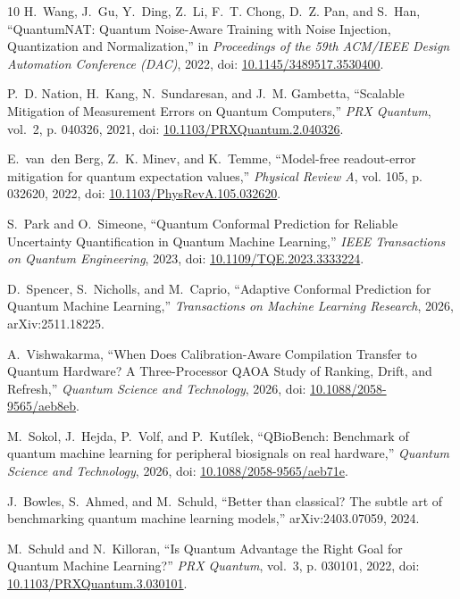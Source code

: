 \documentclass[10pt,conference]{IEEEtran}
\begin{document}
\begin{thebibliography}{10}
H.~Wang, J.~Gu, Y.~Ding, Z.~Li, F.~T. Chong, D.~Z. Pan, and S.~Han,
  ``{QuantumNAT: Quantum Noise-Aware Training with Noise Injection,
  Quantization and Normalization},'' in \emph{Proceedings of the 59th ACM/IEEE
  Design Automation Conference (DAC)}, 2022, doi:
  \href{https://doi.org/10.1145/3489517.3530400}{10.1145/3489517.3530400}.

P.~D. Nation, H.~Kang, N.~Sundaresan, and J.~M. Gambetta, ``{Scalable
  Mitigation of Measurement Errors on Quantum Computers},'' \emph{PRX Quantum},
  vol.~2, p. 040326, 2021, doi:
  \href{https://doi.org/10.1103/PRXQuantum.2.040326}{10.1103/PRXQuantum.2.040326}.

E.~van~den Berg, Z.~K. Minev, and K.~Temme, ``{Model-free readout-error
  mitigation for quantum expectation values},'' \emph{Physical Review A}, vol.
  105, p. 032620, 2022, doi:
  \href{https://doi.org/10.1103/PhysRevA.105.032620}{10.1103/PhysRevA.105.032620}.

S.~Park and O.~Simeone, ``{Quantum Conformal Prediction for Reliable
  Uncertainty Quantification in Quantum Machine Learning},'' \emph{IEEE
  Transactions on Quantum Engineering}, 2023, doi:
  \href{https://doi.org/10.1109/TQE.2023.3333224}{10.1109/TQE.2023.3333224}.

D.~Spencer, S.~Nicholls, and M.~Caprio, ``{Adaptive Conformal Prediction for
  Quantum Machine Learning},'' \emph{Transactions on Machine Learning
  Research}, 2026, arXiv:2511.18225.

A.~Vishwakarma, ``{When Does Calibration-Aware Compilation Transfer to Quantum
  Hardware? A Three-Processor QAOA Study of Ranking, Drift, and Refresh},''
  \emph{Quantum Science and Technology}, 2026, doi:
  \href{https://doi.org/10.1088/2058-9565/aeb8eb}{10.1088/2058-9565/aeb8eb}.

M.~Sokol, J.~Hejda, P.~Volf, and P.~Kut{\'i}lek, ``{QBioBench: Benchmark of
  quantum machine learning for peripheral biosignals on real hardware},''
  \emph{Quantum Science and Technology}, 2026, doi:
  \href{https://doi.org/10.1088/2058-9565/aeb71e}{10.1088/2058-9565/aeb71e}.

J.~Bowles, S.~Ahmed, and M.~Schuld, ``{Better than classical? The subtle art of
  benchmarking quantum machine learning models},'' arXiv:2403.07059, 2024.

M.~Schuld and N.~Killoran, ``{Is Quantum Advantage the Right Goal for Quantum
  Machine Learning?}'' \emph{PRX Quantum}, vol.~3, p. 030101, 2022, doi:
  \href{https://doi.org/10.1103/PRXQuantum.3.030101}{10.1103/PRXQuantum.3.030101}.


\end{thebibliography}
\end{document}

